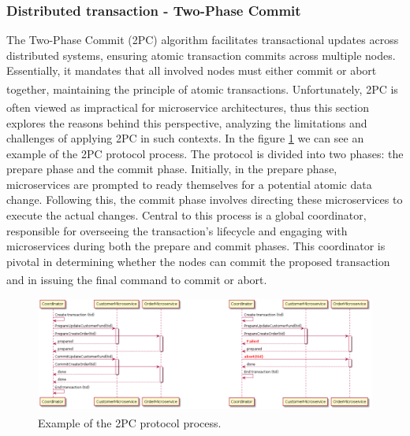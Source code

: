 \subsubsection{Distributed transaction - Two-Phase Commit}
The Two-Phase Commit (2PC) algorithm facilitates transactional updates across distributed systems,
ensuring atomic transaction commits across multiple nodes. Essentially, it mandates that all
involved nodes must either commit or abort together, maintaining the principle of atomic
transactions\textsuperscript{\cite{2pc_1}}. Unfortunately, 2PC is often viewed as impractical for
microservice architectures\textsuperscript{\cite{microservices_book}}, thus this section explores the
reasons behind this perspective, analyzing the limitations and challenges of applying 2PC in such
contexts.
\newline\newline
In the figure \ref{fig:3_2pc} we can see an example of the 2PC protocol process. The protocol is
divided into two phases: the prepare phase and the commit phase. Initially, in the prepare phase,
microservices are prompted to ready themselves for a potential atomic data change. Following this,
the commit phase involves directing these microservices to execute the actual changes. Central to
this process is a global coordinator, responsible for overseeing the transaction's lifecycle and
engaging with microservices during both the prepare and commit phases. This coordinator is pivotal
in determining whether the nodes can commit the proposed transaction and in issuing the final
command to commit or abort\textsuperscript{\cite{2pc_1}}\textsuperscript{\cite{2pc_2}}.

\newpage

\begin{figure}
    \centering
    \includegraphics[scale=0.55]{Pictures/3_2pc.png}
    \caption{Example of the 2PC protocol process\textsuperscript{\cite{2pc_2}}.}
    \label{fig:3_2pc}
\end{figure}

